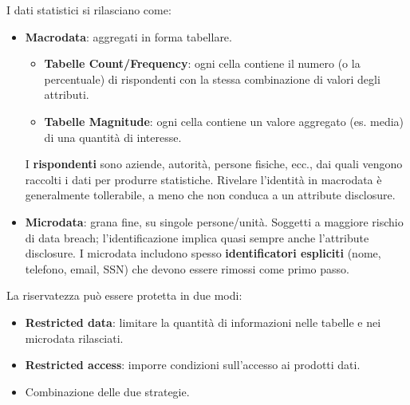 \documentclass[a4paper,11pt]{article}
\begin{document}
I dati statistici si rilasciano come:
\begin{itemize}
  \item \textbf{Macrodata}: aggregati in forma tabellare.
    \begin{itemize}
      \item \textbf{Tabelle Count/Frequency}: ogni cella contiene il numero (o la percentuale) di rispondenti con la stessa combinazione di valori degli attributi.
      \item \textbf{Tabelle Magnitude}: ogni cella contiene un valore aggregato (es. media) di una quantit\`{a} di interesse.
    \end{itemize}
    I \textbf{rispondenti} sono aziende, autorit\`{a}, persone fisiche, ecc., dai quali vengono raccolti i dati per produrre statistiche. Rivelare l'identit\`{a} in macrodata \`{e} generalmente tollerabile, a meno che non conduca a un attribute disclosure.
  \item \textbf{Microdata}: grana fine, su singole persone/unit\`{a}. Soggetti a maggiore rischio di data breach; l'identificazione implica quasi sempre anche l'attribute disclosure. I microdata includono spesso \textbf{identificatori espliciti} (nome, telefono, email, SSN) che devono essere rimossi come primo passo.
\end{itemize}

La riservatezza pu\`{o} essere protetta in due modi:
\begin{itemize}
  \item \textbf{Restricted data}: limitare la quantit\`{a} di informazioni nelle tabelle e nei microdata rilasciati.
  \item \textbf{Restricted access}: imporre condizioni sull'accesso ai prodotti dati.
  \item Combinazione delle due strategie.
\end{itemize}
\end{document}
